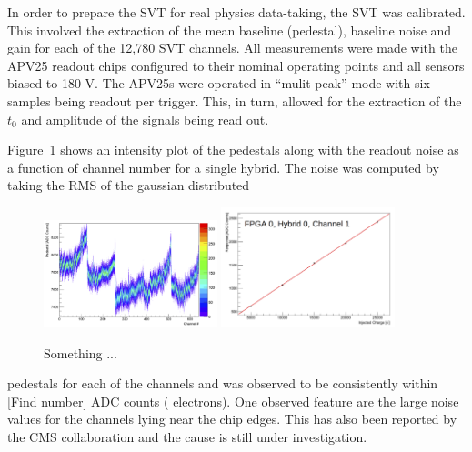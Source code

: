 
%
%
%

In order to prepare the SVT for real physics data-taking, the SVT was 
calibrated. This involved the extraction of the mean baseline (pedestal),
baseline noise and gain for each of the 12,780 SVT channels. All measurements
were made with the APV25 readout chips configured to their nominal operating
points \cite{Jones:1069892} and all sensors biased to 180 V. The APV25s were
operated in ``mulit-peak'' mode with six samples being readout per trigger.
This, in turn, allowed for the extraction of the $t_0$ and amplitude of the 
signals being read out.

Figure~\ref{fig:pedestal_noise} shows an intensity plot of the pedestals 
along with the readout noise as a function of channel number for a single
hybrid.  The noise was computed by taking the RMS of the gaussian distributed
\begin{figure}[h]
    \begin{center}
    	\includegraphics[width=0.45\textwidth]{test2012/svtperformance/baseline}
    	\includegraphics[width=0.45\textwidth]{test2012/svtperformance/gain}
        \caption{Something ... }
	\label{fig:pedestal_noise}
    \end{center}
\end{figure}
pedestals for each of the channels and was observed to be consistently within 
[Find number] ADC counts ( electrons).  One observed feature are the large
noise values for the channels lying near the chip edges.  This has also been 
reported by the CMS collaboration and the cause is still under investigation.

